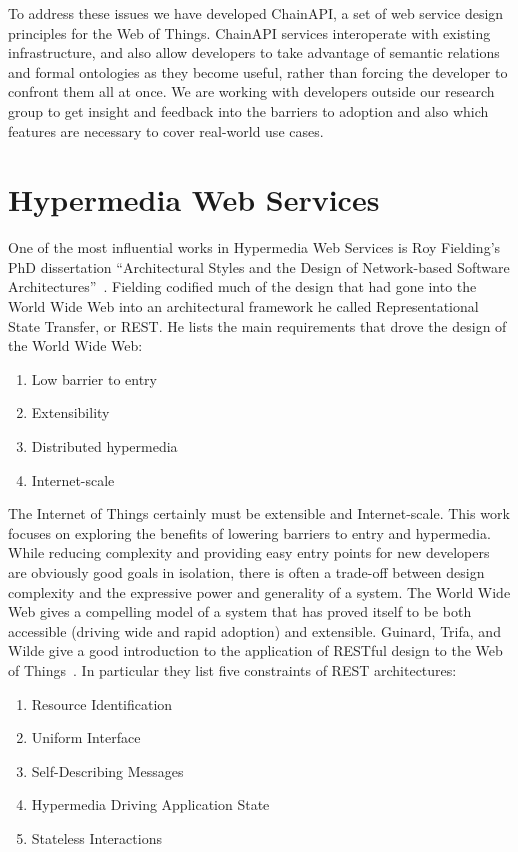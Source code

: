 \documentclass{acm_proc_article-sp}
\newenvironment{tightenumerate}{
    \vspace{-10pt}
    \begin{enumerate}
        \setlength{\parskip}{-1pt}}{
    \end{enumerate}
    \vspace{-10pt}}
\begin{document}
To address these issues we have developed ChainAPI, a set of web service design
principles for the Web of Things. ChainAPI services interoperate with existing
infrastructure, and also allow developers to take advantage of semantic
relations and formal ontologies as they become useful, rather than forcing the
developer to confront them all at once. We are working with developers outside
our research group to get insight and feedback into the barriers to adoption
and also which features are necessary to cover real-world use cases.

\section{Hypermedia Web Services}

One of the most influential works in Hypermedia Web Services is Roy Fielding's
PhD dissertation ``Architectural Styles and the Design of Network-based
Software Architectures''~\cite{fielding}. Fielding codified much of the design
that had gone into the World Wide Web into an architectural framework he called
Representational State Transfer, or REST. He lists the main requirements that
drove the design of the World Wide Web:

\begin{tightenumerate}
    \item Low barrier to entry
    \item Extensibility
    \item Distributed hypermedia
    \item Internet-scale
\end{tightenumerate}

The Internet of Things certainly must be extensible and Internet-scale. This
work focuses on exploring the benefits of lowering barriers to entry and
hypermedia. While reducing complexity and providing easy entry points for new
developers are obviously good goals in isolation, there is often a trade-off
between design complexity and the expressive power and generality of a system.
The World Wide Web gives a compelling model of a system that has
proved itself to be both accessible (driving wide and rapid adoption) and
extensible. Guinard, Trifa, and Wilde give a good introduction to the
application of RESTful design to the Web of Things~\cite{guinard2010}. In
particular they list five constraints of REST architectures:

\begin{tightenumerate}
    \item Resource Identification
    \item Uniform Interface
    \item Self-Describing Messages
    \item Hypermedia Driving Application State
    \item Stateless Interactions
\end{tightenumerate}
\end{document}

